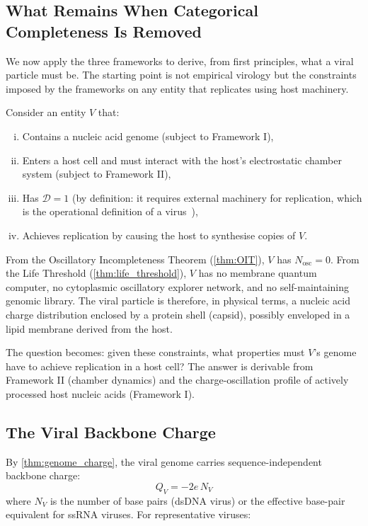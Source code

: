 \documentclass[11pt,twocolumn,a4paper]{article}
\theoremstyle{definition}
\theoremstyle{remark}
\newcommand{\Nosc}{N_{\mathrm{osc}}}
\newcommand{\Dcat}{\mathcal{D}}
\begin{document}
\subsection{What Remains When Categorical Completeness Is Removed}

We now apply the three frameworks to derive, from first principles, what a viral particle must be. The starting point is not empirical virology but the constraints imposed by the frameworks on any entity that replicates using host machinery.

Consider an entity $V$ that:
\begin{enumerate}[(i)]
  \item Contains a nucleic acid genome (subject to Framework I),
  \item Enters a host cell and must interact with the host's electrostatic chamber system (subject to Framework II),
  \item Has $\Dcat = 1$ (by definition: it requires external machinery for replication, which is the operational definition of a virus~\cite{Lwoff1957,Baltimore1971}),
  \item Achieves replication by causing the host to synthesise copies of $V$.
\end{enumerate}

From the Oscillatory Incompleteness Theorem (\cref{thm:OIT}), $V$ has $\Nosc = 0$. From the Life Threshold (\cref{thm:life_threshold}), $V$ has no membrane quantum computer, no cytoplasmic oscillatory explorer network, and no self-maintaining genomic library. The viral particle is therefore, in physical terms, a nucleic acid charge distribution enclosed by a protein shell (capsid), possibly enveloped in a lipid membrane derived from the host.

The question becomes: given these constraints, what properties must $V$'s genome have to achieve replication in a host cell? The answer is derivable from Framework II (chamber dynamics) and the charge-oscillation profile of actively processed host nucleic acids (Framework I).

\subsection{The Viral Backbone Charge}

By \cref{thm:genome_charge}, the viral genome carries sequence-independent backbone charge:
\begin{equation}
  Q_V = -2e \, N_V
  \label{eq:viral_charge}
\end{equation}
where $N_V$ is the number of base pairs (dsDNA virus) or the effective base-pair equivalent for ssRNA viruses. For representative viruses:
\end{document}
